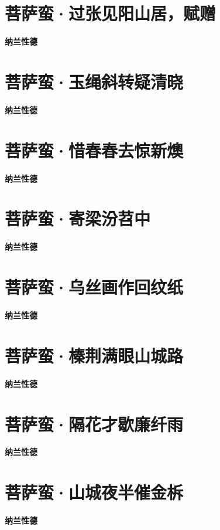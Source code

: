 \documentclass[12pt,a4paper]{ctexbook}
\begin{document}
\section{菩萨蛮·过张见阳山居，赋赠}
\textbf{纳兰性德}\par\vspace{0.5em}

\section{菩萨蛮·玉绳斜转疑清晓}
\textbf{纳兰性德}\par\vspace{0.5em}

\section{菩萨蛮·惜春春去惊新燠}
\textbf{纳兰性德}\par\vspace{0.5em}

\section{菩萨蛮·寄梁汾苕中}
\textbf{纳兰性德}\par\vspace{0.5em}

\section{菩萨蛮·乌丝画作回纹纸}
\textbf{纳兰性德}\par\vspace{0.5em}

\section{菩萨蛮·榛荆满眼山城路}
\textbf{纳兰性德}\par\vspace{0.5em}

\section{菩萨蛮·隔花才歇廉纤雨}
\textbf{纳兰性德}\par\vspace{0.5em}

\section{菩萨蛮·山城夜半催金柝}
\textbf{纳兰性德}\par\vspace{0.5em}
\end{document}
